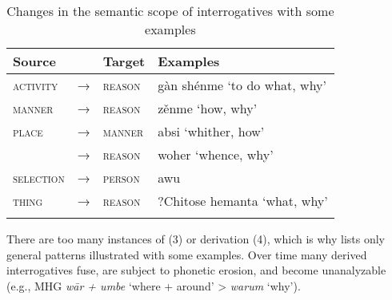 \begin{table}
\caption{Changes in the semantic scope of interrogatives with some examples}
\label{tab:6:12}

\begin{tabularx}{\textwidth}{lllQ}
\lsptoprule

\textbf{Source} &  & \textbf{Target} & \textbf{Examples}\\
\midrule
\textsc{activity} & → & \textsc{reason} &  gàn shénme ‘to do what, why’\\
\textsc{manner} & → & \textsc{reason} &  zěnme ‘how, why’\\
\textsc{place} & → & \textsc{manner} &  absi ‘whither, how’\\
& → & \textsc{reason} &  woher ‘whence, why’\\
\textsc{selection} & → & \textsc{person} &  awu\\
\textsc{thing} & → & \textsc{reason} & ?Chitose  hemanta ‘what, why’\\
\lspbottomrule
\end{tabularx}
\end{table}

There are too many instances of  (3) or derivation (4), which is why  lists only general patterns illustrated with some examples. Over time many derived interrogatives fuse, are subject to phonetic erosion, and become unanalyzable (e.g., MHG \textit{w\=ar + umbe} ‘where + around’ >  \textit{warum} ‘why’).

